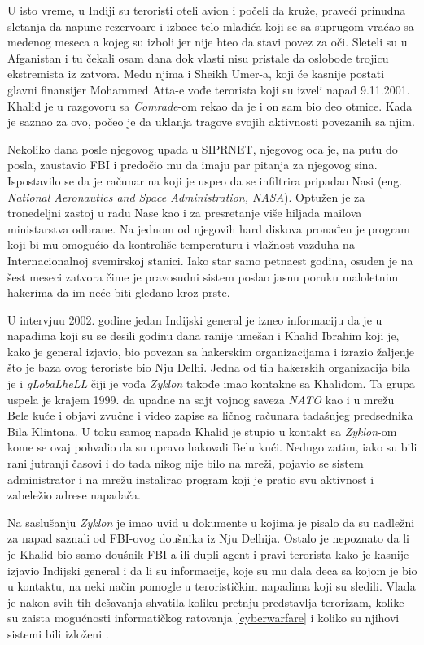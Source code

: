 \documentclass[a4paper]{article}
\begin{document}
U isto vreme, u Indiji su teroristi oteli avion i počeli da kruže, praveći prinudna sletanja da napune rezervoare i izbace telo mladića koji se sa suprugom vraćao sa medenog meseca a kojeg su izboli jer nije hteo da stavi povez za oči. Sleteli su u Afganistan i tu čekali osam dana dok vlasti nisu pristale da oslobode trojicu ekstremista iz zatvora. Među njima i Sheikh Umer-a, koji će kasnije postati glavni finansijer Mohammed Atta-e vođe terorista koji su izveli napad 9.11.2001. Khalid je u razgovoru sa \textit{Comrade}-om rekao da je i on sam bio deo otmice. Kada je saznao za ovo, počeo je da uklanja tragove svojih aktivnosti povezanih sa njim.

Nekoliko dana posle njegovog upada u SIPRNET, njegovog oca je, na putu do posla, zaustavio FBI i predočio mu da imaju par pitanja za njegovog sina. Ispostavilo se da je računar na koji je uspeo da se infiltrira pripadao Nasi (eng. \textit{National Aeronautics and Space Administration, NASA}). Optužen je za tronedeljni zastoj u radu Nase kao i za presretanje više hiljada mailova ministarstva odbrane. Na jednom od njegovih hard diskova pronađen je program koji bi mu omogućio da kontroliše temperaturu i vlažnost vazduha na Internacionalnoj svemirskoj stanici. Iako star samo petnaest godina, osuđen je na šest meseci zatvora čime je pravosudni sistem poslao jasnu poruku maloletnim hakerima da im neće biti gledano kroz prste. 

U intervjuu 2002. godine jedan Indijski general je izneo informaciju da je u napadima koji su se desili godinu dana ranije umešan i Khalid Ibrahim koji je, kako je general izjavio, bio povezan sa hakerskim organizacijama i izrazio žaljenje što je baza ovog teroriste bio Nju Delhi. Jedna od tih hakerskih organizacija bila je i \textit{gLobaLheLL} čiji je vođa \textit{Zyklon} takođe imao kontakne sa Khalidom. Ta grupa uspela je krajem 1999. da upadne na sajt vojnog saveza \textit{NATO} kao i u mrežu Bele kuće i objavi zvučne i video zapise sa ličnog računara tadašnjeg predsednika Bila Klintona. U toku samog napada Khalid je stupio u kontakt sa \textit{Zyklon}-om kome se ovaj pohvalio da su upravo hakovali Belu kući. Nedugo zatim, iako su bili rani jutranji časovi i do tada nikog nije bilo na mreži, pojavio se sistem administrator i na mrežu instalirao program koji je pratio svu aktivnost i zabeležio adrese napadača.

Na saslušanju \textit{Zyklon} je imao uvid u dokumente u kojima je pisalo da su nadležni za napad saznali od FBI-ovog doušnika iz Nju Delhija. Ostalo je nepoznato da li je Khalid bio samo doušnik FBI-a ili dupli agent i pravi terorista kako je kasnije izjavio Indijski general i da li su informacije, koje su mu dala deca sa kojom je bio u kontaktu, na neki način pomogle u terorističkim napadima koji su sledili. Vlada je nakon svih tih dešavanja shvatila koliku pretnju predstavlja terorizam, kolike su zaista mogućnosti informatičkog ratovanja \ref{cyberwarfare} i koliko su njihovi sistemi bili izloženi \cite{intrusion}.
\end{document}
